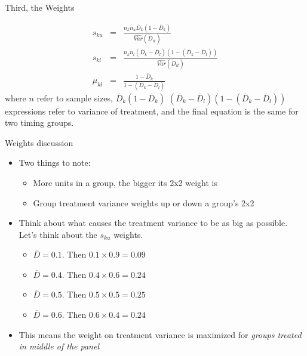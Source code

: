 \documentclass{beamer}
\begin{document}
\begin{frame}{Third, the Weights}

 \begin{eqnarray*} s_{ku} &=& \frac{ n_k n_u \overline{D}_k (1- \overline{D}_k ) }{ \widehat{Var} ( \tilde{D}_{it} )} \\
s_{kl} &=& \frac{ n_k n_l (\overline{D}_k - \overline{D}_{l} ) ( 1- ( \overline{D}_k - \overline{D}_{l} )) }{\widehat{Var}(\tilde{D}_{it})} \\
\mu_{kl} &=& \frac{1 - \overline{D}_k }{1 - ( \overline{D}_k - \overline{D}_{l} )}
\end{eqnarray*}where $n$ refer to sample sizes, $\overline{D}_k (1- \overline{D}_k )$ $(\overline{D}_k - \overline{D}_{l} ) ( 1- ( \overline{D}_k - \overline{D}_{l} ))$ expressions refer to variance of treatment, and the final equation is the same for two timing groups.

\end{frame}

\begin{frame}{Weights discussion}

\begin{itemize}
\item Two things to note:
	\begin{itemize}
	\item More units in a group, the bigger its 2x2 weight is
	\item Group treatment variance weights up or down a group's 2x2
	\end{itemize}
\item Think about what causes the treatment variance to be as big as possible. Let's think about the $s_{ku}$ weights.
	\begin{itemize}
	\item $\overline{D}=0.1$. Then $0.1 \times 0.9 = 0.09$
	\item $\overline{D}=0.4$. Then $0.4 \times 0.6 =0.24$
	\item $\overline{D}=0.5$. Then $0.5 \times 0.5 = 0.25$
	\item $\overline{D}=0.6$. Then $0.6 \times 0.4 = 0.24$
	\end{itemize}
\item This means the weight on treatment variance is maximized for \emph{groups treated in middle of the panel}
\end{itemize}
\end{frame}
\end{document}

